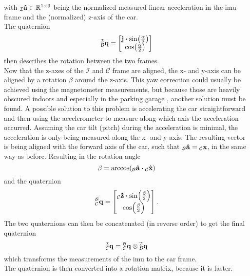 with $\vincs{\vu{a}}{i} \in \mathbb{R}^{1\times3}$ being the normalized measured linear acceleration in the \gls{imu} frame and  the (normalized) z-axis of the car.\\
The quaternion
\begin{equation}
	\qtf{i}{b} =
	\begin{bmatrix}
		\vb{j}\vdot\sin(\frac{\alpha}{2}) \\
		\cos(\frac{\alpha}{2})
	\end{bmatrix}
\end{equation}
then describes the rotation between the two frames.\\
Now that the z-axes of the $\mathcal{I}$ and $\mathcal{C}$ frame are aligned, the x- and y-axis can be aligned by a rotation $\beta$ around the z-axis.
This yaw correction could usually be achieved using the magnetometer measurements, but because those are heavily obscured indoors and especially in the parking garage \cite{Li2012}, another solution must be found.
A possible solution to this problem is accelerating the car straightforward and then using the accelerometer to measure along which axis the acceleration occurred.
Assuming the car tilt (pitch) during the acceleration is minimal, the acceleration is only being measured along the x- and y-axis.
The resulting vector is being aligned with the forward axis of the car, such that $\vincs{\hat{a}}{b} = \vincs{x}{c}$, in the same way as before.
Resulting in the rotation angle
\begin{equation}
	\beta = \arccos(\vincs{\vu{a}}{b} \vdot \vincs{\hat{x}}{c})
\end{equation}
and the quaternion
\begin{equation}
	\qtf{b}{c} =
	\begin{bmatrix}
		\vincs{\hat{z}}{c}\vdot\sin(\frac{\beta}{2}) \\
		\cos(\frac{\beta}{2})
	\end{bmatrix}.
\end{equation}
The two quaternions can then be concatenated (in reverse order) to get the final quaternion
\begin{equation}
	\qtf{i}{c} = \qtf{b}{c} \otimes  \qtf{i}{b}
\end{equation}
which transforms the measurements of the \gls{imu} to the car frame.\\
The quaternion is then converted into a rotation matrix, because it is faster.
